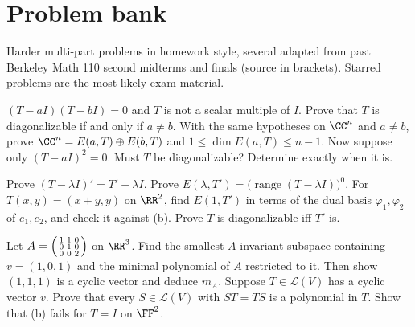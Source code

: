 \documentclass[10pt]{scrartcl}
\DeclareMathOperator{\range}{range}
\newcommand{\LL}{\mathcal L}
\begin{document}
\section{Problem bank}
Harder multi-part problems in homework style, several adapted from past Berkeley Math 110 second midterms and finals (source in brackets). Starred problems are the most likely exam material.

\begin{problem}
  \leavevmode
  \begin{enumerate}[(a)]
    \ii $(T-aI)(T-bI)=0$ and $T$ is not a scalar multiple of $I$. Prove that $T$ is diagonalizable if and only if $a\ne b$.
    \ii With the same hypotheses on $\CC^n$ and $a\ne b$, prove $\CC^n=E(a,T)\oplus E(b,T)$ and $1\le\dim E(a,T)\le n-1$.
    \ii Now suppose only $(T-aI)^2=0$. Must $T$ be diagonalizable? Determine exactly when it is.
  \end{enumerate}
\end{problem}

\begin{problem}
  \leavevmode
  \begin{enumerate}[(a)]
    \ii Prove $(T-\lambda I)'=T'-\lambda I$.
    \ii Prove $E(\lambda,T')=\big(\range(T-\lambda I)\big)^0$.
    \ii For $T(x,y)=(x+y,y)$ on $\RR^2$, find $E(1,T')$ in terms of the dual basis $\varphi_1,\varphi_2$ of $e_1,e_2$, and check it against (b).
    \ii Prove $T$ is diagonalizable iff $T'$ is.
  \end{enumerate}
\end{problem}

\begin{problem}
  \leavevmode
  \begin{enumerate}[(a)]
    \ii Let $A=\begin{psmallmatrix}1&1&0\\0&1&0\\0&0&2\end{psmallmatrix}$ on $\RR^3$. Find the smallest $A$-invariant subspace containing $v=(1,0,1)$ and the minimal polynomial of $A$ restricted to it. Then show $(1,1,1)$ is a cyclic vector and deduce $m_A$.
    \ii Suppose $T\in\LL(V)$ has a cyclic vector $v$. Prove that every $S\in\LL(V)$ with $ST=TS$ is a polynomial in $T$.
    \ii Show that (b) fails for $T=I$ on $\FF^2$.
  \end{enumerate}
\end{problem}
\end{document}
